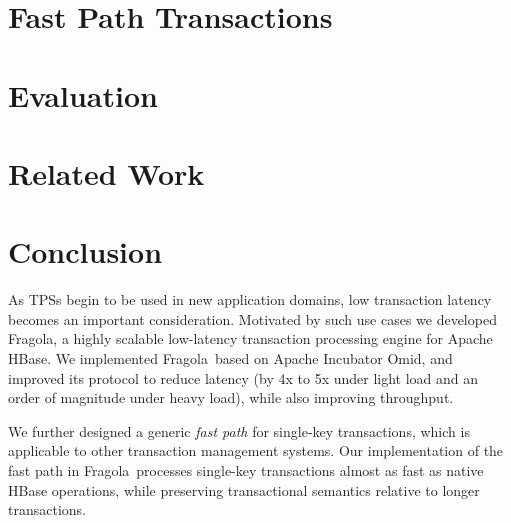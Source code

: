 \documentclass[letterpaper,twocolumn,10pt]{article}
\newcommand{\sys}{Fragola}
\begin{document}
\section{Fast Path Transactions}
\label{sec:alg}


\section{Evaluation} \label{sec:eval}


\section{Related Work} \label{sec:related}


\section{Conclusion} \label{sec:conclusions}

As TPSs begin to be used in new application domains, low transaction 
latency becomes an important consideration. 
Motivated by such use cases we developed \sys, a highly scalable 
low-latency transaction processing engine for Apache HBase. 
We implemented \sys\ based on Apache Incubator Omid, and 
improved its protocol to reduce latency (by 4x to 5x under light load
and an order of magnitude under heavy load), 
while also improving throughput. 

We further designed a generic \emph{fast path} for single-key transactions,
which is applicable to other transaction management systems.
Our implementation of the fast path in \sys\ processes single-key
transactions almost as fast as native HBase operations, while preserving
transactional semantics relative to longer transactions.


\newpage



\end{document}
